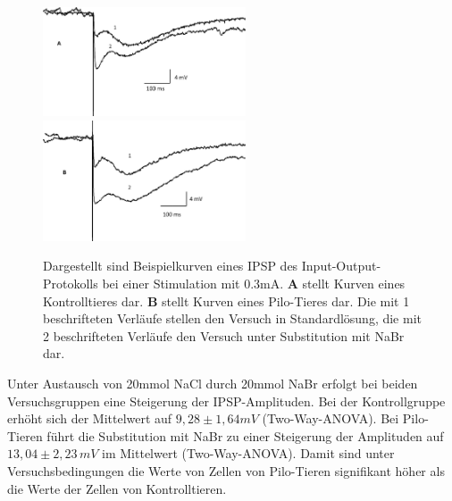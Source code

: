 \documentclass[a4paper,11pt]{report}
\begin{document}
{\begin{figure}[H]
\begin{center}
\includegraphics[width=6cm]{Abbildungen/inout_kontrolle_sample.jpg}
\includegraphics[width=6cm]{Abbildungen/inout_pilo_sample.jpg}
\caption{Dargestellt sind Beispielkurven eines IPSP des Input-Output-Protokolls bei einer Stimulation mit 0.3mA. \textbf{A}  stellt Kurven eines Kontrolltieres dar. \textbf{B} stellt Kurven eines Pilo-Tieres dar. Die mit 1 beschrifteten Verläufe stellen den Versuch in Standardlösung, die mit 2 beschrifteten Verläufe den Versuch unter Substitution mit NaBr dar.}
\end{center}
\end{figure}




Unter Austausch von 20mmol NaCl durch 20mmol NaBr erfolgt bei beiden Versuchsgruppen  eine Steigerung der IPSP-Amplituden. Bei der Kontrollgruppe erhöht sich der Mittelwert auf $9,28 \pm 1,64mV$ (Two-Way-ANOVA).
Bei Pilo-Tieren führt die Substitution mit NaBr zu einer Steigerung der Amplituden auf $13,04 \pm 2,23\, mV$ im Mittelwert (Two-Way-ANOVA). Damit sind unter Versuchsbedingungen die Werte von Zellen von Pilo-Tieren signifikant höher als die Werte der Zellen von Kontrolltieren. \\



}
\end{document}
